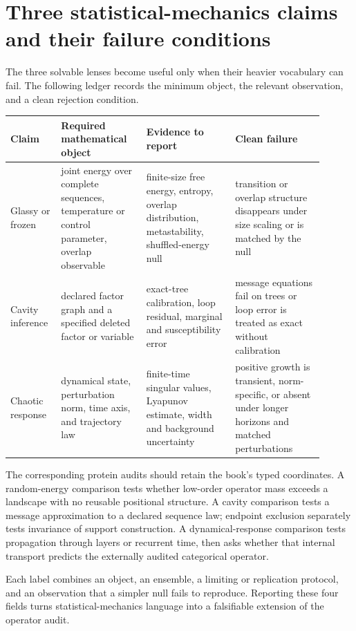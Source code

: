 \section{Three statistical-mechanics claims and their failure conditions}

The three solvable lenses become useful only when their heavier vocabulary can fail.  The following
ledger records the minimum object, the relevant observation, and a clean rejection condition.

\begin{center}
\small
\begin{tabular}{@{}>{\raggedright\arraybackslash}p{0.13\linewidth}
                >{\raggedright\arraybackslash}p{0.25\linewidth}
                >{\raggedright\arraybackslash}p{0.26\linewidth}
                >{\raggedright\arraybackslash}p{0.26\linewidth}@{}}
\toprule
Claim & Required mathematical object & Evidence to report & Clean failure \\
\midrule
Glassy or frozen & joint energy over complete sequences, temperature or control parameter, overlap observable & finite-size free energy, entropy, overlap distribution, metastability, shuffled-energy null & transition or overlap structure disappears under size scaling or is matched by the null \\
Cavity inference & declared factor graph and a specified deleted factor or variable & exact-tree calibration, loop residual, marginal and susceptibility error & message equations fail on trees or loop error is treated as exact without calibration \\
Chaotic response & dynamical state, perturbation norm, time axis, and trajectory law & finite-time singular values, Lyapunov estimate, width and background uncertainty & positive growth is transient, norm-specific, or absent under longer horizons and matched perturbations \\
\bottomrule
\end{tabular}
\end{center}

The corresponding protein audits should retain the book's typed coordinates.  A random-energy
comparison tests whether low-order operator mass exceeds a landscape with no reusable positional
structure.  A cavity comparison tests a message approximation to a declared sequence law;
endpoint exclusion separately tests invariance of support construction.  A dynamical-response
comparison tests propagation through layers or recurrent time, then asks whether that internal
transport predicts the externally audited categorical operator.

Each label combines an object, an ensemble, a limiting or replication protocol, and an observation
that a simpler null fails to reproduce.  Reporting these four fields
turns statistical-mechanics language into a falsifiable extension of the operator audit.
